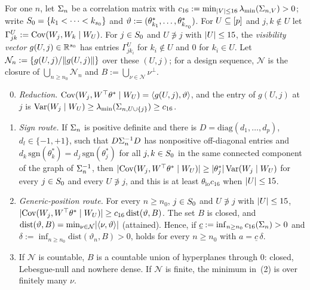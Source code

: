
\begin{supplem}\label{rem:vis}
For one $n$, let $\Sigma_n$ be a correlation matrix with $c_{16}:=\min_{\lvert V\rvert\le16}\lambda_{\min}(\Sigma_{n,V})>0$; write
$S_0=\{k_1<\dots<k_{s_0}\}$ and $\vartheta:=(\theta^*_{k_1},\dots,\theta^*_{k_{s_0}})$. For $U\subseteq[p]$ and $j,k\notin U$
let $\Gamma^U_{jk}:=\operatorname{Cov}(W_j,W_k\mid W_U)$. For $j\in S_0$ and $U\not\ni j$ with $\lvert U\rvert\le15$, the \emph{visibility vector}
$g(U,j)\in\mathbb{R}^{s_0}$ has entries $\Gamma^U_{jk_i}$ for $k_i\notin U$ and $0$ for $k_i\in U$. Let
$\mathcal N_n:=\{g(U,j)/\lVert g(U,j)\rVert\}$ over these $(U,j)$; for a design sequence, $\mathcal N$ is the closure of
$\bigcup_{n\ge n_0}\mathcal N_n$ and $B:=\bigcup_{\nu\in\mathcal N}\nu^\perp$.
\begin{enumerate}[label=(\arabic*),leftmargin=2em,itemsep=1pt]
  \setcounter{enumi}{-1}
  \item \emph{Reduction.} $\operatorname{Cov}(W_j,W^\top\theta^*\mid W_U)=\langle g(U,j),\vartheta\rangle$, and the entry of $g(U,j)$ at $j$ is
    $\operatorname{Var}(W_j\mid W_U)\ge\lambda_{\min}(\Sigma_{n,U\cup\{j\}})\ge c_{16}$.
  \item \emph{Sign route.} If $\Sigma_n$ is positive definite and there is $D=\mathrm{diag}(d_1,\dots,d_p)$, $d_l\in\{-1,+1\}$,
    such that $D\Sigma_n^{-1}D$ has nonpositive off-diagonal entries and $d_k\,\mathrm{sgn}(\theta^*_k)=d_j\,\mathrm{sgn}(\theta^*_j)$
    for all $j,k\in S_0$ in the same connected component of the graph of $\Sigma_n^{-1}$, then
    $\lvert \operatorname{Cov}(W_j,W^\top\theta^*\mid W_U)\rvert\ge\lvert \theta^*_j\rvert\operatorname{Var}(W_j\mid W_U)$ for every $j\in S_0$ and every $U\not\ni j$, and
    this is at least $\theta_{\mathrm{lo}}c_{16}$ when $\lvert U\rvert\le15$.
  \item \emph{Generic-position route.} For every $n\ge n_0$, $j\in S_0$ and $U\not\ni j$ with $\lvert U\rvert\le15$,
    $\lvert \operatorname{Cov}(W_j,W^\top\theta^*\mid W_U)\rvert\ge c_{16}\,\mathrm{dist}(\vartheta,B)$. The set $B$ is closed, and
    $\mathrm{dist}(\vartheta,B)=\min_{\nu\in\mathcal N}\lvert \langle\nu,\vartheta\rangle\rvert$ (attained). Hence, if
    $\underline c:=\inf_{n\ge n_0}c_{16}(\Sigma_n)>0$ and $\delta:=\inf_{n\ge n_0}\mathrm{dist}(\vartheta_n,B)>0$,  holds for
    every $n\ge n_0$ with $a=\underline c\,\delta$.
  \item If $\mathcal N$ is countable, $B$ is a countable union of hyperplanes through $0$: closed, Lebesgue-null and
    nowhere dense. If $\mathcal N$ is finite, the minimum in~(2) is over finitely many $\nu$.

\end{enumerate}
\end{supplem}
